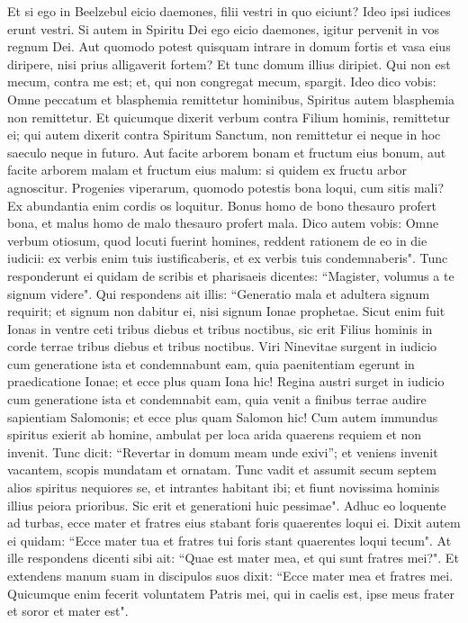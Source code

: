 \begin{biblechapter}
\verse Et si ego in Beelzebul eicio daemones, filii vestri in quo eiciunt? Ideo ipsi iudices erunt vestri. 
\verse Si autem in Spiritu Dei ego eicio daemones, igitur pervenit in vos regnum Dei. 
\verse Aut quomodo potest quisquam intrare in domum fortis et vasa eius diripere, nisi prius alligaverit fortem? Et tunc domum illius diripiet. 
\verse Qui non est mecum, contra me est; et, qui non congregat mecum, spargit. 
\verse Ideo dico vobis: Omne peccatum et blasphemia remittetur hominibus, Spiritus autem blasphemia non remittetur. 
\verse Et quicumque dixerit verbum contra Filium hominis, remittetur ei; qui autem dixerit contra Spiritum Sanctum, non remittetur ei neque in hoc saeculo neque in futuro. 
\verse Aut facite arborem bonam et fructum eius bonum, aut facite arborem malam et fructum eius malum: si quidem ex fructu arbor agnoscitur. 
\verse Progenies viperarum, quomodo potestis bona loqui, cum sitis mali? Ex abundantia enim cordis os loquitur. 
\verse Bonus homo de bono thesauro profert bona, et malus homo de malo thesauro profert mala. 
\verse Dico autem vobis: Omne verbum otiosum, quod locuti fuerint homines, reddent rationem de eo in die iudicii:  
\verse ex verbis enim tuis iustificaberis, et ex verbis tuis condemnaberis". 
\verse Tunc responderunt ei quidam de scribis et pharisaeis dicentes: “Magister, volumus a te signum videre". 
\verse Qui respondens ait illis: “Generatio mala et adultera signum requirit; et signum non dabitur ei, nisi signum Ionae prophetae. 
\verse Sicut enim fuit Ionas in ventre ceti tribus diebus et tribus noctibus, sic erit Filius hominis in corde terrae tribus diebus et tribus noctibus. 
\verse Viri Ninevitae surgent in iudicio cum generatione ista et condemnabunt eam, quia paenitentiam egerunt in praedicatione Ionae; et ecce plus quam Iona hic! 
\verse Regina austri surget in iudicio cum generatione ista et condemnabit eam, quia venit a finibus terrae audire sapientiam Salomonis; et ecce plus quam Salomon hic! 
\verse Cum autem immundus spiritus exierit ab homine, ambulat per loca arida quaerens requiem et non invenit. 
\verse Tunc dicit: “Revertar in domum meam unde exivi”; et veniens invenit vacantem, scopis mundatam et ornatam. 
\verse Tunc vadit et assumit secum septem alios spiritus nequiores se, et intrantes habitant ibi; et fiunt novissima hominis illius peiora prioribus. Sic erit et generationi huic pessimae". 
\verse Adhuc eo loquente ad turbas, ecce mater et fratres eius stabant foris quaerentes loqui ei. 
\verse Dixit autem ei quidam: “Ecce mater tua et fratres tui foris stant quaerentes loqui tecum". 
\verse At ille respondens dicenti sibi ait: “Quae est mater mea, et qui sunt fratres mei?". 
\verse Et extendens manum suam in discipulos suos dixit: “Ecce mater mea et fratres mei. 
\verse Quicumque enim fecerit voluntatem Patris mei, qui in caelis est, ipse meus frater et soror et mater est". 
\end{biblechapter}

